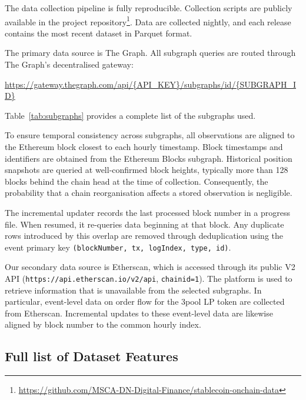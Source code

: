 \documentclass[a4paper,fleqn]{cas-sc}
\begin{document}
The data collection pipeline is fully reproducible. Collection scripts are publicly available in the project repository\footnote{\url{https://github.com/MSCA-DN-Digital-Finance/stablecoin-onchain-data}}. Data are collected nightly, and each release contains the most recent dataset in Parquet format.

The primary data source is The Graph. All subgraph queries are routed through The Graph's decentralised gateway:
\begin{center}
\url{https://gateway.thegraph.com/api/{API_KEY}/subgraphs/id/{SUBGRAPH_ID}}
\end{center}
Table~\ref{tab:subgraphs} provides a complete list of the subgraphs used.

To ensure temporal consistency across subgraphs, all observations are aligned to the Ethereum block closest to each hourly timestamp. Block timestamps and identifiers are obtained from the Ethereum Blocks subgraph. Historical position snapshots are queried at well-confirmed block heights, typically more than 128 blocks behind the chain head at the time of collection. Consequently, the probability that a chain reorganisation affects a stored observation is negligible.

The incremental updater records the last processed block number in a progress file. When resumed, it re-queries data beginning at that block. Any duplicate rows introduced by this overlap are removed through deduplication using the event primary key \texttt{(blockNumber, tx, logIndex, type, id)}.

Our secondary data source is Etherscan, which is accessed through its public V2 API (\texttt{https://api.etherscan.io/v2/api}, \texttt{chainid=1}). The platform is used to retrieve information that is unavailable from the selected subgraphs. In particular, event-level data on order flow for the 3pool LP token are collected from Etherscan. Incremental updates to these event-level data are likewise aligned by block number to the common hourly index.



\subsection{Full list of Dataset Features}
\end{document}
